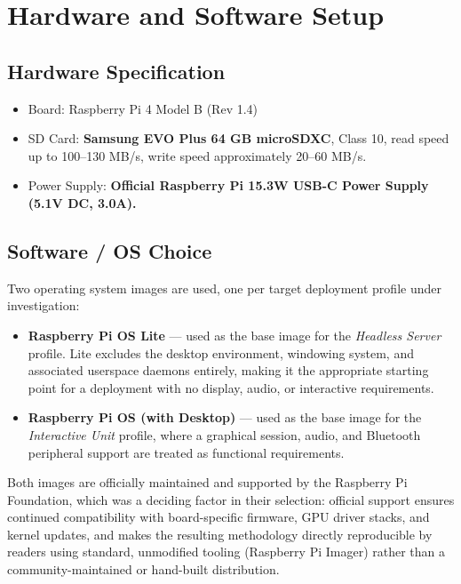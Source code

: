 \documentclass[11pt,a4paper]{article}
\begin{document}
\section{Hardware and Software Setup}

\subsection{Hardware Specification}
\begin{itemize}
    \item Board: Raspberry Pi 4 Model B (Rev 1.4)
    \item SD Card: \textbf{Samsung EVO Plus 64 GB microSDXC}, Class 10, read speed up to 100--130 MB/s, write speed approximately 20--60 MB/s.
    \item Power Supply: \textbf{Official Raspberry Pi 15.3W USB-C Power Supply (5.1V DC, 3.0A).}
\end{itemize}

\subsection{Software / OS Choice}

Two operating system images are used, one per target deployment profile under investigation:

\begin{itemize}
    \item \textbf{Raspberry Pi OS Lite} — used as the base image for the \textit{Headless Server} profile. Lite excludes the desktop environment, windowing system, and associated userspace daemons entirely, making it the appropriate starting point for a deployment with no display, audio, or interactive requirements.
    \item \textbf{Raspberry Pi OS (with Desktop)} — used as the base image for the \textit{Interactive Unit} profile, where a graphical session, audio, and Bluetooth peripheral support are treated as functional requirements.
\end{itemize}

Both images are officially maintained and supported by the Raspberry Pi Foundation, which was a deciding factor in their selection: official support ensures continued compatibility with board-specific firmware, GPU driver stacks, and kernel updates, and makes the resulting methodology directly reproducible by readers using standard, unmodified tooling (Raspberry Pi Imager) rather than a community-maintained or hand-built distribution.
\end{document}
